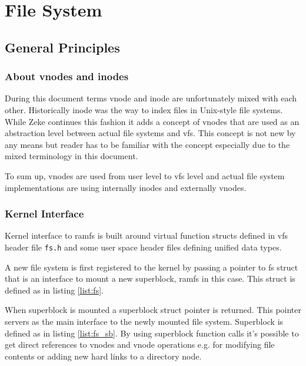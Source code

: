 \part{File System}

\chapter{General Principles}

\section{About vnodes and inodes}

During this document terms \acs{vnode} and \acs{inode} are unfortunately mixed
with each other. Historically inode was the way to index files in Unix-style
file systems.\cite{Wikipedia:inode} While Zeke continues this fashion it adds
a concept of vnodes that are used as an abstraction level between actual file
systems and \acf{vfs}. This concept is not new by any means but reader has to
be familiar with the concept especially due to the mixed terminology in this
document.

To sum up, vnodes are used from user level to \acs{vfs} level and actual file
system implementations are using internally inodes and externally vnodes.

\section{Kernel Interface}

Kernel interface to ramfs is built around virtual function structs defined in
\acs{vfs} header file \verb+fs.h+ and some user space header files defining
unified data types.

A new file system is first registered to the kernel by passing a pointer to
fs struct that is an interface to mount a new superblock, ramfs in this case.
This struct is defined as in listing \ref{list:fs}.

When superblock is mounted a superblock struct pointer is returned. This pointer
servers as the main interface to the newly mounted file system. Superblock is
defined as in listing \ref{list:fs_sb}. By using superblock function calls it's
possible to get direct references to vnodes and \acs{vnode} operations e.g. for
modifying file contents or adding new hard links to a directory node.




